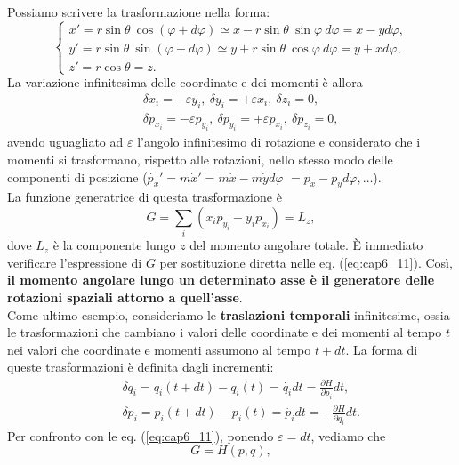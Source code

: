 Possiamo scrivere la trasformazione nella forma:
\begin{equation}
\begin{cases}
x'= r \sin \theta \ \cos (\varphi + d \varphi ) \simeq x- r \sin \theta \ \sin \varphi \ d \varphi = x-yd\varphi ,\\
y'= r \sin \theta \ \sin (\varphi + d \varphi ) \simeq y+ r \sin \theta \ \cos \varphi \ d \varphi = y+xd\varphi ,\\
z' = r\cos \theta = z .
\end{cases}
\end{equation}
La variazione infinitesima delle coordinate e dei momenti è allora
\begin{eqnarray}
& & \delta x_i = -\varepsilon y_i, \ \delta y_i = +\varepsilon x_i, \ \delta z_i =0,\\
& & \delta p_{x_i} = -\varepsilon p_{y_i}, \ \delta p_{y_i} = +\varepsilon p_{x_i}, \ \delta p_{z_i} =0,
\end{eqnarray}
avendo uguagliato ad $\varepsilon$ l'angolo infinitesimo di rotazione e considerato che i momenti si trasformano, rispetto alle rotazioni, nello stesso modo delle componenti di posizione ($\dot{p_x}'= m \dot{x}'=  m\dot{x}-m\dot{y}d\varphi$ $=p_x-p_yd\varphi , \dots$).\\
La funzione generatrice di questa trasformazione è
\begin{equation}
G= \sum _i (x_ip_{y_i} - y_i p_{x_i}) = L_z ,
\end{equation}
dove $L_z$ è la componente lungo $z$ del momento angolare totale. È immediato verificare l'espressione di $G$ per sostituzione diretta nelle eq. (\ref{eq:cap6_11}). Così, \textbf{il momento angolare lungo un determinato asse è il generatore delle rotazioni spaziali attorno a quell'asse}.\\
Come ultimo esempio, consideriamo le \textbf{traslazioni temporali} infinitesime, ossia le trasformazioni che cambiano i valori delle coordinate e dei momenti al tempo $t$ nei valori che coordinate e momenti assumono al tempo $t+dt$. La forma di queste trasformazioni è definita dagli incrementi:
\begin{eqnarray}
& &\delta q_i = q_i(t+dt)-q_i(t) = \dot{q_i} dt = \frac{\partial H}{\partial p_i}dt, \\
& &\delta p_i = p_i(t+dt)-p_i(t) = \dot{p_i} dt = -\frac{\partial H}{\partial q_i}dt. 
\end{eqnarray}
Per confronto con le eq. (\ref{eq:cap6_11}), ponendo $\varepsilon = dt$, vediamo che
\begin{equation}
G=H(p,q) ,
\end{equation}
